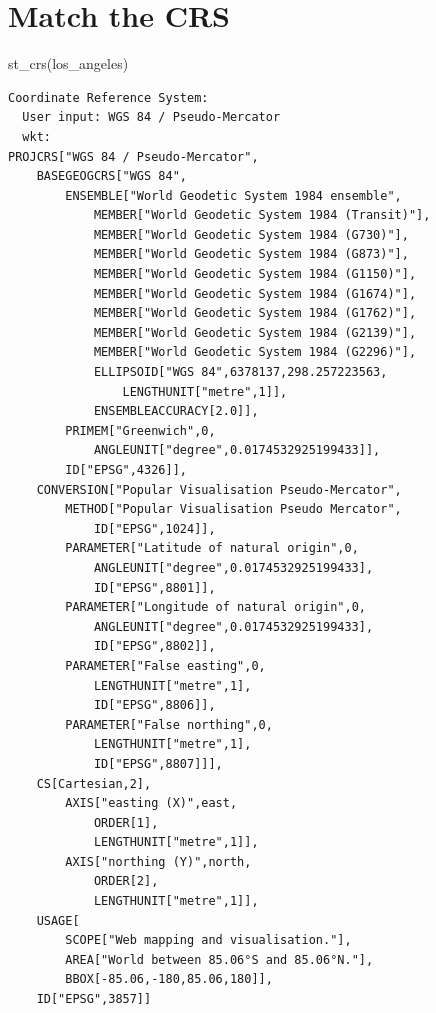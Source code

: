 \documentclass[
  letterpaper,
  DIV=11,
  numbers=noendperiod]{scrartcl}
\newenvironment{Shaded}{\begin{snugshade}}{\end{snugshade}}
\newcommand{\FunctionTok}[1]{\textcolor[rgb]{0.28,0.35,0.67}{#1}}
\newcommand{\NormalTok}[1]{\textcolor[rgb]{0.00,0.23,0.31}{#1}}
\begin{document}
\section{Match the CRS}\label{match-the-crs}

\begin{Shaded}
\begin{Highlighting}[]
\FunctionTok{st\_crs}\NormalTok{(los\_angeles)}
\end{Highlighting}
\end{Shaded}

\begin{verbatim}
Coordinate Reference System:
  User input: WGS 84 / Pseudo-Mercator 
  wkt:
PROJCRS["WGS 84 / Pseudo-Mercator",
    BASEGEOGCRS["WGS 84",
        ENSEMBLE["World Geodetic System 1984 ensemble",
            MEMBER["World Geodetic System 1984 (Transit)"],
            MEMBER["World Geodetic System 1984 (G730)"],
            MEMBER["World Geodetic System 1984 (G873)"],
            MEMBER["World Geodetic System 1984 (G1150)"],
            MEMBER["World Geodetic System 1984 (G1674)"],
            MEMBER["World Geodetic System 1984 (G1762)"],
            MEMBER["World Geodetic System 1984 (G2139)"],
            MEMBER["World Geodetic System 1984 (G2296)"],
            ELLIPSOID["WGS 84",6378137,298.257223563,
                LENGTHUNIT["metre",1]],
            ENSEMBLEACCURACY[2.0]],
        PRIMEM["Greenwich",0,
            ANGLEUNIT["degree",0.0174532925199433]],
        ID["EPSG",4326]],
    CONVERSION["Popular Visualisation Pseudo-Mercator",
        METHOD["Popular Visualisation Pseudo Mercator",
            ID["EPSG",1024]],
        PARAMETER["Latitude of natural origin",0,
            ANGLEUNIT["degree",0.0174532925199433],
            ID["EPSG",8801]],
        PARAMETER["Longitude of natural origin",0,
            ANGLEUNIT["degree",0.0174532925199433],
            ID["EPSG",8802]],
        PARAMETER["False easting",0,
            LENGTHUNIT["metre",1],
            ID["EPSG",8806]],
        PARAMETER["False northing",0,
            LENGTHUNIT["metre",1],
            ID["EPSG",8807]]],
    CS[Cartesian,2],
        AXIS["easting (X)",east,
            ORDER[1],
            LENGTHUNIT["metre",1]],
        AXIS["northing (Y)",north,
            ORDER[2],
            LENGTHUNIT["metre",1]],
    USAGE[
        SCOPE["Web mapping and visualisation."],
        AREA["World between 85.06°S and 85.06°N."],
        BBOX[-85.06,-180,85.06,180]],
    ID["EPSG",3857]]
\end{verbatim}
\end{document}
